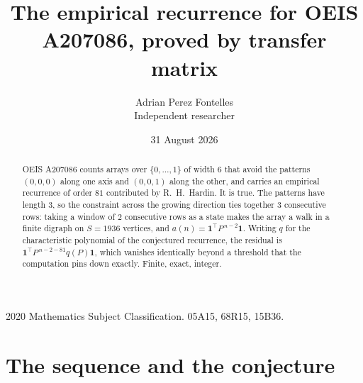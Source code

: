 \documentclass[11pt,a4paper]{article}
\title{The empirical recurrence for OEIS A207086, proved by transfer matrix}
\author{Adrian Perez Fontelles\\ \small Independent researcher}
\date{31 August 2026}
\theoremstyle{plain}
\theoremstyle{definition}
\begin{document}
\maketitle

\begin{abstract}
OEIS A207086 counts arrays over $\{0,\dots,1\}$ of width $6$ that avoid the patterns
$(0,0,0)$ along one axis and $(0,0,1)$ along the other, and carries an empirical recurrence of
order $81$ contributed by R.~H.~Hardin. It is true. The patterns have length $3$, so
the constraint across the growing direction ties together $3$ consecutive rows: taking a
window of $2$ consecutive rows as a state makes the array a walk in a finite digraph
on $S=1936$ vertices, and $a(n)=\mathbf{1}^{\!\top}P^{\,n-2}\mathbf{1}$. Writing $q$
for the characteristic polynomial of the conjectured recurrence, the residual is
$\mathbf{1}^{\!\top}P^{\,n-2-81}q(P)\mathbf{1}$, which vanishes identically
beyond a threshold that the computation pins down exactly. Finite, exact, integer.
\end{abstract}

\noindent\small 2020 Mathematics Subject Classification. 05A15, 68R15, 15B36.\normalsize

\section{The sequence and the conjecture}
\end{document}

